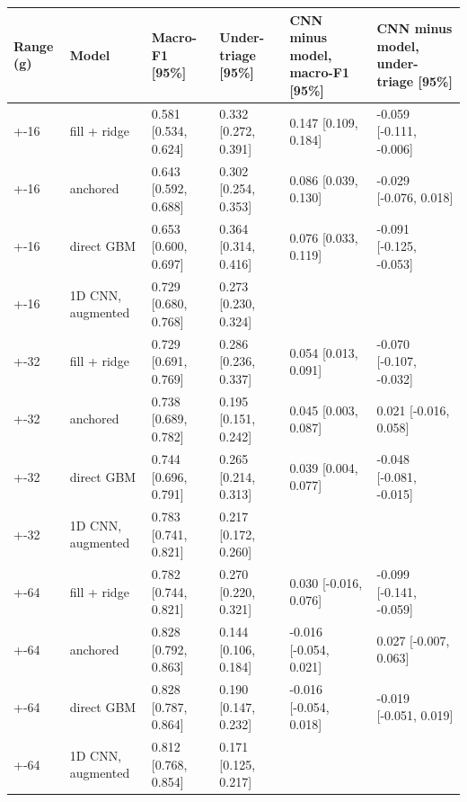 \begin{tabular}{llllll}
\toprule
Range (g) & Model & Macro-F1 [95\%] & Under-triage [95\%] & CNN minus model, macro-F1 [95\%] & CNN minus model, under-triage [95\%] \\
\midrule
+-16 & fill + ridge & 0.581 [0.534, 0.624] & 0.332 [0.272, 0.391] & 0.147 [0.109, 0.184] & -0.059 [-0.111, -0.006] \\
+-16 & anchored & 0.643 [0.592, 0.688] & 0.302 [0.254, 0.353] & 0.086 [0.039, 0.130] & -0.029 [-0.076, 0.018] \\
+-16 & direct GBM & 0.653 [0.600, 0.697] & 0.364 [0.314, 0.416] & 0.076 [0.033, 0.119] & -0.091 [-0.125, -0.053] \\
+-16 & 1D CNN, augmented & 0.729 [0.680, 0.768] & 0.273 [0.230, 0.324] &  &  \\
+-32 & fill + ridge & 0.729 [0.691, 0.769] & 0.286 [0.236, 0.337] & 0.054 [0.013, 0.091] & -0.070 [-0.107, -0.032] \\
+-32 & anchored & 0.738 [0.689, 0.782] & 0.195 [0.151, 0.242] & 0.045 [0.003, 0.087] & 0.021 [-0.016, 0.058] \\
+-32 & direct GBM & 0.744 [0.696, 0.791] & 0.265 [0.214, 0.313] & 0.039 [0.004, 0.077] & -0.048 [-0.081, -0.015] \\
+-32 & 1D CNN, augmented & 0.783 [0.741, 0.821] & 0.217 [0.172, 0.260] &  &  \\
+-64 & fill + ridge & 0.782 [0.744, 0.821] & 0.270 [0.220, 0.321] & 0.030 [-0.016, 0.076] & -0.099 [-0.141, -0.059] \\
+-64 & anchored & 0.828 [0.792, 0.863] & 0.144 [0.106, 0.184] & -0.016 [-0.054, 0.021] & 0.027 [-0.007, 0.063] \\
+-64 & direct GBM & 0.828 [0.787, 0.864] & 0.190 [0.147, 0.232] & -0.016 [-0.054, 0.018] & -0.019 [-0.051, 0.019] \\
+-64 & 1D CNN, augmented & 0.812 [0.768, 0.854] & 0.171 [0.125, 0.217] &  &  \\
\bottomrule
\end{tabular}

